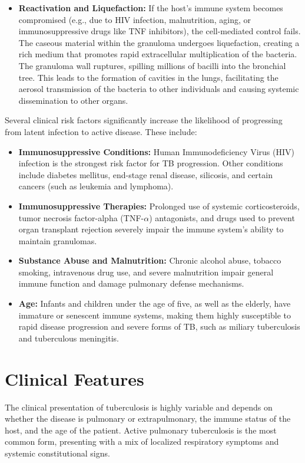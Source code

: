 \begin{itemize}
    \item \textbf{Reactivation and Liquefaction:} If the host's immune system becomes compromised (e.g., due to HIV infection, malnutrition, aging, or immunosuppressive drugs like TNF inhibitors), the cell-mediated control fails. The caseous material within the granuloma undergoes liquefaction, creating a rich medium that promotes rapid extracellular multiplication of the bacteria. The granuloma wall ruptures, spilling millions of bacilli into the bronchial tree. This leads to the formation of cavities in the lungs, facilitating the aerosol transmission of the bacteria to other individuals and causing systemic dissemination to other organs.
\end{itemize}

Several clinical risk factors significantly increase the likelihood of progressing from latent infection to active disease. These include:

\begin{itemize}
    \item \textbf{Immunosuppressive Conditions:} Human Immunodeficiency Virus (HIV) infection is the strongest risk factor for TB progression. Other conditions include diabetes mellitus, end-stage renal disease, silicosis, and certain cancers (such as leukemia and lymphoma).
    \item \textbf{Immunosuppressive Therapies:} Prolonged use of systemic corticosteroids, tumor necrosis factor-alpha (TNF-$\alpha$) antagonists, and drugs used to prevent organ transplant rejection severely impair the immune system's ability to maintain granulomas.
    \item \textbf{Substance Abuse and Malnutrition:} Chronic alcohol abuse, tobacco smoking, intravenous drug use, and severe malnutrition impair general immune function and damage pulmonary defense mechanisms.
    \item \textbf{Age:} Infants and children under the age of five, as well as the elderly, have immature or senescent immune systems, making them highly susceptible to rapid disease progression and severe forms of TB, such as miliary tuberculosis and tuberculous meningitis.
\end{itemize}

\section*{Clinical Features}
The clinical presentation of tuberculosis is highly variable and depends on whether the disease is pulmonary or extrapulmonary, the immune status of the host, and the age of the patient. Active pulmonary tuberculosis is the most common form, presenting with a mix of localized respiratory symptoms and systemic constitutional signs.

